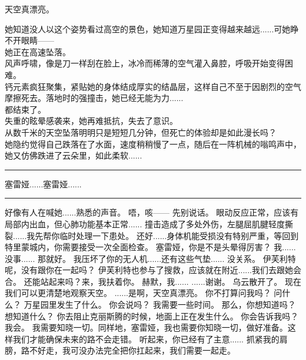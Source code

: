 \documentclass[openany]{book}
\begin{document}
\begin{dialogue}
     天空真漂亮。\par
    她知道没人以这个姿势看过高空的景色，她知道万星园正变得越来越远......可她睁不开眼睛——\\
    她正在高速坠落。\\
    风声呼啸，像是刀一样刮在脸上，冰冷而稀薄的空气灌入鼻腔，呼吸开始变得困难。\\
    钙元素疯狂聚集，紧贴她的身体结成厚实的结晶层，这样自己不至于因剧烈的空气摩擦死去。落地时的强撞击，她已经无能为力......\\
    都结束了。\\
    失重的眩晕感袭来，她再难抵抗，失去了意识。\\
    从数千米的天空坠落明明只是短短几分钟，但死亡的体验却是如此漫长吗？\\
    她隐约觉得自己跌落在了水面，速度稍稍慢了一点，随后在一阵机械的嗡鸣声中，她又仿佛跌进了云朵里，如此柔软......
    \par\noindent\rule{\textwidth}{0.4pt}
    塞雷娅......塞雷娅......
    \par\noindent\rule{\textwidth}{0.4pt}\par
    好像有人在喊她......熟悉的声音。
     唔，咳——
     先别说话。
     眼动反应正常，应该有局部内出血，但心肺功能基本正常......
     撞击造成了多处外伤，左腿屈肌腱轻度撕裂......我先帮你临时处理一下患处。
     还好......身体机能受损没有特别严重，等回到特里蒙城内，你需要接受一次全面检查。
     塞雷娅，你是不是头晕得厉害？
     我......没事......
     那就好。
     我压坏了你的无人机......还有这些气垫......
     没关系。
     伊芙利特呢，没有跟你在一起吗？
     伊芙利特也参与了搜救，应该就在附近......我们去跟她会合。
     还能站起来吗？来，我扶着你。
     赫默，我......
     ......谢谢。
     乌云散开了。
     现在我们可以更清楚地观察天空。
     ......是啊，天空真漂亮。
     你不打算问我吗？
     问什么？
     万星园里发生了什么。
     你会说吗？
     我需要一些时间。
     那么，你想知道吗？
     想知道什么？
     你去阻止克丽斯腾的时候，地面上正在发生什么。
     你会告诉我吗？
     我会。
     我需要知晓一切。同样地，塞雷娅，我也需要你知晓一切，做好准备。这样我们才能确保未来的路不会走错。
     听起来，你已经有了主意......
     抓紧我的肩膀，路不好走，我可没办法完全把你扛起来，我们需要一起走。
\end{dialogue}
\end{document}
